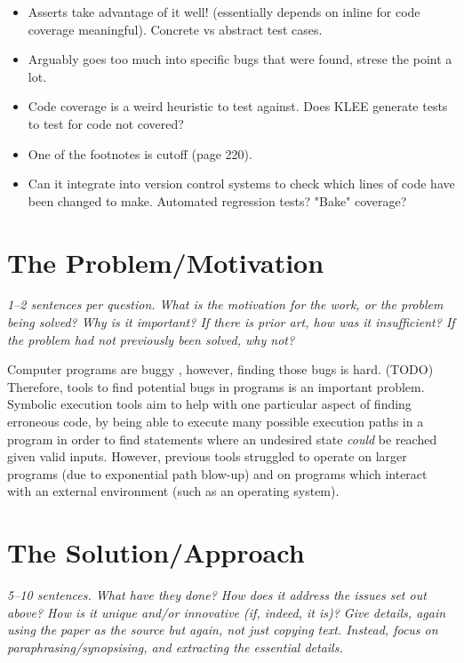 \documentclass[11pt]{article}
\begin{document}
\begin{itemize}
    \item Asserts take advantage of it well! (essentially depends on inline for
    code coverage meaningful). Concrete vs abstract test cases.

    \item Arguably goes too much into specific bugs that were found, strese the
    point a lot.

    \item Code coverage is a weird heuristic to test against. Does KLEE generate
    tests to test for code not covered?

    \item One of the footnotes is cutoff (page 220).

    \item Can it integrate into version control systems to check which lines of
    code have been changed to make. Automated regression tests? "Bake"
    coverage?

\end{itemize}

\section*{The Problem/Motivation}

\textsl{1--2 sentences per question. What is the motivation for the work, or
the problem being solved? Why is it important? If there is prior art, how was
it insufficient? If the problem had not previously been solved, why not?}

Computer programs are buggy \cite{GitHubBugs}, however, finding those bugs is
hard. (TODO) Therefore, tools to find potential bugs in programs is an
important problem. Symbolic execution tools aim to help with one particular
aspect of finding erroneous code, by being able to execute many possible
execution paths in a program in order to find statements where an undesired
state \textit{could} be reached given valid inputs. However, previous tools
struggled to operate on larger programs (due to exponential path blow-up) and on
programs which interact with an external environment (such as an operating
system).

\section*{The Solution/Approach}

\textsl{5--10 sentences. What have they done? How does it address the issues
set out above? How is it unique and/or innovative (if, indeed, it is)? Give
details, again using the paper as the source but again, not just copying text.
Instead, focus on paraphrasing/synopsising, and extracting the essential
details.}
\end{document}
